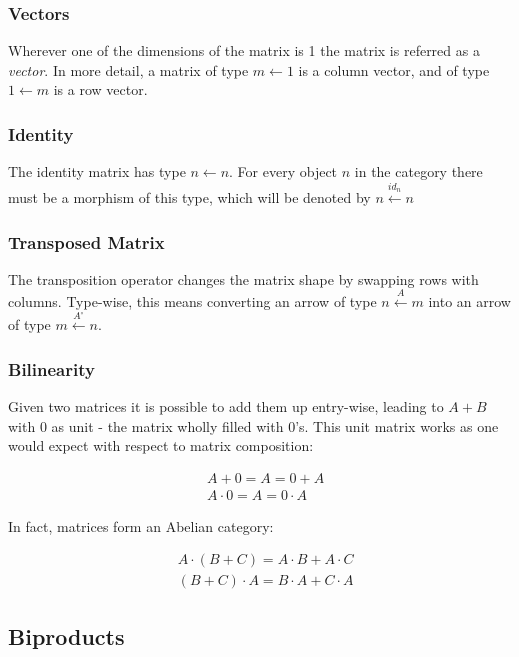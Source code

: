 \documentclass[
  oneside,
  11pt, a4paper,
  footinclude=true,
  headinclude=true,
  cleardoublepage=empty
]{scrbook}
\theoremstyle{definition}
\theoremstyle{definition}
\begin{document}
            \subsubsection{Vectors} Wherever one of the dimensions of the matrix is 1 the matrix is referred as a \emph{vector}. In more detail, a matrix of type $m \leftarrow 1$ is a column vector, and of type $1 \leftarrow m$ is a row vector.
            
            \subsubsection{Identity} The identity matrix has type $n \leftarrow n$. For every object $n$ in the category there must be a morphism of this type, which will be denoted by $n \xleftarrow{id_n} n$
            
             \subsubsection{Transposed Matrix} The transposition operator changes the matrix shape by swapping rows with columns. Type-wise, this means converting an arrow of type $n \xleftarrow{A} m$ into an arrow of type $m \xleftarrow{A^\circ} n$.
            
            \subsubsection{Bilinearity} Given two matrices it is possible to add them up entry-wise, leading to $A + B$ with $0$ as unit - the matrix wholly filled with $0$'s. This unit matrix works as one would expect with respect to matrix composition:
            
            \begin{align*}
                & A + 0 = A = 0 + A \\
                & A \cdot 0 = A = 0 \cdot A
            \end{align*}
            
            In fact, matrices form an Abelian category:
            
            \begin{align*}
                & A \cdot (B + C) = A \cdot B + A \cdot C\\
                & (B + C) \cdot A = B \cdot A + C \cdot A
            \end{align*}
    
        \subsection{Biproducts}
        
\end{document}
